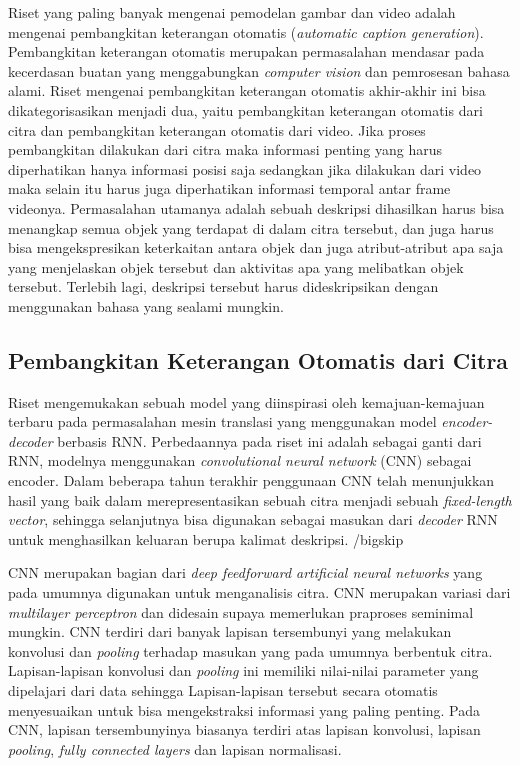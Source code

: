 Riset yang paling banyak mengenai pemodelan gambar dan video adalah mengenai pembangkitan keterangan otomatis (\textit{automatic caption generation}). Pembangkitan keterangan otomatis merupakan permasalahan mendasar pada kecerdasan buatan yang menggabungkan \textit{computer vision} dan pemrosesan bahasa alami. Riset mengenai pembangkitan keterangan otomatis akhir-akhir ini bisa dikategorisasikan menjadi dua, yaitu pembangkitan keterangan otomatis dari citra dan pembangkitan keterangan otomatis dari video. Jika proses pembangkitan dilakukan dari citra maka informasi penting yang harus diperhatikan hanya informasi posisi saja sedangkan jika dilakukan dari video maka selain itu harus juga diperhatikan informasi temporal antar frame videonya. Permasalahan utamanya adalah sebuah deskripsi dihasilkan harus bisa menangkap semua objek yang terdapat di dalam citra tersebut, dan juga harus bisa mengekspresikan keterkaitan antara objek dan juga atribut-atribut apa saja yang menjelaskan objek tersebut dan aktivitas apa yang melibatkan objek tersebut. Terlebih lagi, deskripsi tersebut harus dideskripsikan dengan menggunakan bahasa yang sealami mungkin.


\subsection{Pembangkitan Keterangan Otomatis dari Citra}

Riset \textcite{Vinyals2014} mengemukakan sebuah model yang diinspirasi oleh kemajuan-kemajuan terbaru pada permasalahan mesin translasi yang menggunakan model \textit{encoder-decoder} berbasis RNN. Perbedaannya pada riset ini adalah sebagai ganti dari RNN, modelnya menggunakan \textit{convolutional neural network} (CNN) sebagai encoder. Dalam beberapa tahun terakhir penggunaan CNN telah menunjukkan hasil yang baik dalam merepresentasikan sebuah citra menjadi sebuah \textit{fixed-length vector}, sehingga selanjutnya bisa digunakan sebagai masukan dari \textit{decoder} RNN untuk menghasilkan keluaran berupa kalimat deskripsi.
/bigskip

CNN merupakan bagian dari \textit{deep feedforward artificial neural networks} yang pada umumnya digunakan untuk menganalisis citra. CNN merupakan variasi dari \textit{multilayer perceptron} dan didesain supaya memerlukan praproses seminimal mungkin. CNN terdiri dari banyak lapisan tersembunyi yang melakukan konvolusi dan \textit{pooling} terhadap masukan yang pada umumnya berbentuk citra. Lapisan-lapisan konvolusi dan \textit{pooling} ini memiliki nilai-nilai parameter yang dipelajari dari data sehingga Lapisan-lapisan tersebut secara otomatis menyesuaikan untuk bisa mengekstraksi informasi yang paling penting. Pada CNN, lapisan tersembunyinya biasanya terdiri atas lapisan konvolusi, lapisan \textit{pooling}, \textit{fully connected layers} dan lapisan normalisasi. 
\bigskip

